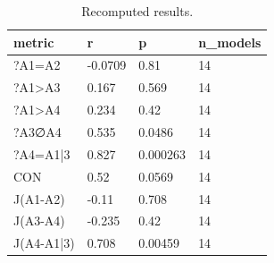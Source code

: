 \begin{table}[!t]
\centering\scriptsize
\begin{tabular}{llll}
\toprule
metric & r & p & n\_models \\
\midrule
?A1=A2 & -0.0709 & 0.81 & 14 \\
?A1>A3 & 0.167 & 0.569 & 14 \\
?A1>A4 & 0.234 & 0.42 & 14 \\
?A3∅A4 & 0.535 & 0.0486 & 14 \\
?A4=A1|3 & 0.827 & 0.000263 & 14 \\
CON & 0.52 & 0.0569 & 14 \\
J(A1-A2) & -0.11 & 0.708 & 14 \\
J(A3-A4) & -0.235 & 0.42 & 14 \\
J(A4-A1|3) & 0.708 & 0.00459 & 14 \\
\bottomrule
\end{tabular}
\caption{Recomputed results.}
\label{tab:Pearson}
\end{table}
